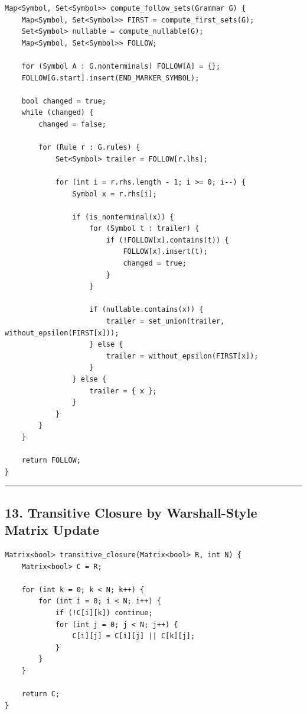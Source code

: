 \documentclass[10pt,letterpaper]{article}
\begin{document}
\begin{verbatim}
Map<Symbol, Set<Symbol>> compute_follow_sets(Grammar G) {
    Map<Symbol, Set<Symbol>> FIRST = compute_first_sets(G);
    Set<Symbol> nullable = compute_nullable(G);
    Map<Symbol, Set<Symbol>> FOLLOW;

    for (Symbol A : G.nonterminals) FOLLOW[A] = {};
    FOLLOW[G.start].insert(END_MARKER_SYMBOL);

    bool changed = true;
    while (changed) {
        changed = false;

        for (Rule r : G.rules) {
            Set<Symbol> trailer = FOLLOW[r.lhs];

            for (int i = r.rhs.length - 1; i >= 0; i--) {
                Symbol x = r.rhs[i];

                if (is_nonterminal(x)) {
                    for (Symbol t : trailer) {
                        if (!FOLLOW[x].contains(t)) {
                            FOLLOW[x].insert(t);
                            changed = true;
                        }
                    }

                    if (nullable.contains(x)) {
                        trailer = set_union(trailer, without_epsilon(FIRST[x]));
                    } else {
                        trailer = without_epsilon(FIRST[x]);
                    }
                } else {
                    trailer = { x };
                }
            }
        }
    }

    return FOLLOW;
}
\end{verbatim}

\medskip\hrule\medskip

\subsection*{13. Transitive Closure by Warshall-Style Matrix Update}

\begin{verbatim}
Matrix<bool> transitive_closure(Matrix<bool> R, int N) {
    Matrix<bool> C = R;

    for (int k = 0; k < N; k++) {
        for (int i = 0; i < N; i++) {
            if (!C[i][k]) continue;
            for (int j = 0; j < N; j++) {
                C[i][j] = C[i][j] || C[k][j];
            }
        }
    }

    return C;
}
\end{verbatim}
\end{document}
